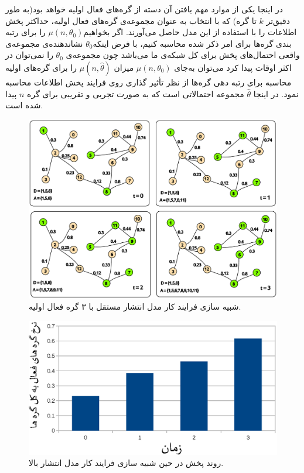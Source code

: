 \begin{persian}
{\centerline{
}

در اینجا یکی از موارد مهم یافتن آن دسته از گره‌های فعال اولیه خواهد بود(به طور دقیق‌تر $k$ تا گره) که با انتخاب به عنوان مجموعه‌ی گره‌های فعال اولیه، حداکثر پخش اطلاعات را با استفاده از این مدل حاصل می‌آورند. اگر بخواهیم$\mu(n,\theta_0)$ را برای رتبه بندی گره‌ها برای امر ذکر شده محاسبه کنیم، با فرض اینکه$\theta_0$ نشاندهنده‌ی مجموعه‌ی واقعی احتمال‌های پخش برای کل شبکه‌ی ما می‌باشد چون مجموعه‌ی $\theta_0$ را نمی‌توان در اکثر اوقات پیدا کرد می‌توان به‌جای $\mu(n,\theta_0)$ میزان $\mu(n,\hat{\theta})$ را برای گره‌های اولیه محاسبه برای رتبه دهی گره‌ها از نظر تأثیر گذاری روی فرایند پخش اطلاعات محاسبه نمود. در اینجا $\hat{\theta}$ مجموعه احتمالاتی است که به صورت تجربی و تقریبی برای گره $n$ پیدا شده است.



 \begin{figure}[H]
 \centering
 \includegraphics[scale=0.24]{figures/icm}
 \caption[مدل انتشار مستقل]
 { شبیه سازی فرایند کار مدل انتشار مستقل با ۳ گره فعال اولیه.}
\end{figure}

 \begin{figure}[H]
 \centering
 \includegraphics[scale=0.6]{figures/icm_chart1}
 \caption[شبیه سازی مدل انتشار مستقل]
 {روند پخش در حین شبیه سازی فرایند کار مدل انتشار بالا.}
\end{figure}


}
\end{persian}

